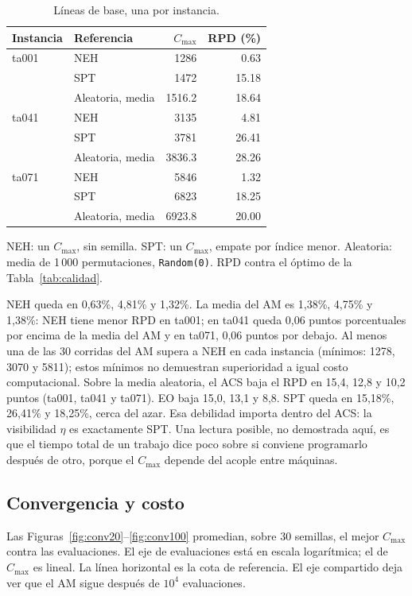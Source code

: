 \documentclass[journal]{IEEEtran}
\newcounter{lin}\newcommand{\li}{\stepcounter{lin}\thelin:\ }
\newcommand{\notatabla}[1]{\par\vspace{4pt}\colorbox{gray!12}{\parbox{\dimexpr\linewidth-2\fboxsep\relax}{\footnotesize\raggedright #1}}}
\begin{document}
\begin{table}[!t]
  \caption{Líneas de base, una por instancia.}\label{tab:base}
  \centering\footnotesize
  \begin{tabular}{l l r r}\hline
    Instancia & Referencia & $C_{\max}$ & RPD (\%)\\ \hline
    ta001 & NEH & 1286 & 0.63\\
    & SPT & 1472 & 15.18\\
    & Aleatoria, media & 1516.2 & 18.64\\ \hline
    ta041 & NEH & 3135 & 4.81\\
    & SPT & 3781 & 26.41\\
    & Aleatoria, media & 3836.3 & 28.26\\ \hline
    ta071 & NEH & 5846 & 1.32\\
    & SPT & 6823 & 18.25\\
    & Aleatoria, media & 6923.8 & 20.00\\ \hline
  \end{tabular}
  \notatabla{NEH: un $C_{\max}$, sin semilla. SPT: un $C_{\max}$, empate por índice menor. Aleatoria: media de 1\,000 permutaciones, \texttt{Random(0)}. RPD contra el óptimo de la Tabla~\ref{tab:calidad}.}
\end{table}

NEH queda en 0,63\%, 4,81\% y 1,32\%. La media del AM es 1,38\%, 4,75\% y 1,38\%: NEH tiene menor RPD en ta001; en ta041 queda 0,06 puntos porcentuales por encima de la media del AM y en ta071, 0,06 puntos por debajo. Al menos una de las 30 corridas del AM supera a NEH en cada instancia (mínimos: 1278, 3070 y 5811); estos mínimos no demuestran superioridad a igual costo computacional. Sobre la media aleatoria, el ACS baja el RPD en 15,4, 12,8 y 10,2 puntos (ta001, ta041 y ta071). EO baja 15,0, 13,1 y 8,8. SPT queda en 15,18\%, 26,41\% y 18,25\%, cerca del azar. Esa debilidad importa dentro del ACS: la visibilidad $\eta$ es exactamente SPT. Una lectura posible, no demostrada aquí, es que el tiempo total de un trabajo dice poco sobre si conviene programarlo después de otro, porque el $C_{\max}$ depende del acople entre máquinas.

\subsection{Convergencia y costo}
Las Figuras~\ref{fig:conv20}--\ref{fig:conv100} promedian, sobre 30 semillas, el mejor $C_{\max}$ contra las evaluaciones. El eje de evaluaciones está en escala logarítmica; el de $C_{\max}$ es lineal. La línea horizontal es la cota de referencia. El eje compartido deja ver que el AM sigue después de $10^4$ evaluaciones.
\end{document}
